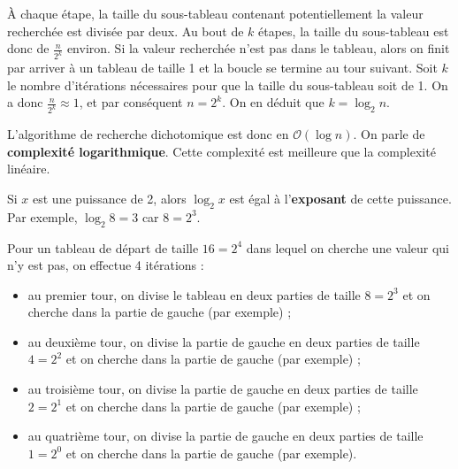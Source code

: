 \documentclass[
  a4paper,
  DIV=11,
  numbers=noendperiod]{scrartcl}
\providecommand{\tightlist}{%
  \setlength{\itemsep}{0pt}\setlength{\parskip}{0pt}}\usepackage{longtable,booktabs,array}
\begin{document}
À chaque étape, la taille du sous-tableau contenant potentiellement la
valeur recherchée est divisée par deux. Au bout de \(k\) étapes, la
taille du sous-tableau est donc de \(\frac{n}{2^k}\) environ. Si la
valeur recherchée n'est pas dans le tableau, alors on finit par arriver
à un tableau de taille 1 et la boucle se termine au tour suivant. Soit
\(k\) le nombre d'itérations nécessaires pour que la taille du
sous-tableau soit de 1. On a donc \(\frac{n}{2^k}\approx 1\), et par
conséquent \(n=2^k\). On en déduit que \(k=\log_2 n\).

L'algorithme de recherche dichotomique est donc en
\(\mathcal{O}(\log n)\). On parle de \textbf{complexité logarithmique}.
Cette complexité est meilleure que la complexité linéaire.

\begin{tcolorbox}[enhanced jigsaw, colframe=quarto-callout-note-color-frame, toprule=.15mm, bottomrule=.15mm, title=\textcolor{quarto-callout-note-color}{\faInfo}\hspace{0.5em}{Notion de logarithme de base 2}, colbacktitle=quarto-callout-note-color!10!white, leftrule=.75mm, left=2mm, opacityback=0, rightrule=.15mm, toptitle=1mm, opacitybacktitle=0.6, breakable, titlerule=0mm, colback=white, coltitle=black, bottomtitle=1mm, arc=.35mm]

Si \(x\) est une puissance de 2, alors \(\log_2 x\) est égal à
l'\textbf{exposant} de cette puissance. Par exemple, \(\log_2 8 = 3\)
car \(8 = 2^3\).

\end{tcolorbox}

Pour un tableau de départ de taille \(16=2^4\) dans lequel on cherche
une valeur qui n'y est pas, on effectue 4 itérations :

\begin{itemize}
\tightlist
\item
  au premier tour, on divise le tableau en deux parties de taille
  \(8=2^3\) et on cherche dans la partie de gauche (par exemple) ;
\item
  au deuxième tour, on divise la partie de gauche en deux parties de
  taille \(4=2^2\) et on cherche dans la partie de gauche (par exemple)
  ;
\item
  au troisième tour, on divise la partie de gauche en deux parties de
  taille \(2=2^1\) et on cherche dans la partie de gauche (par exemple)
  ;
\item
  au quatrième tour, on divise la partie de gauche en deux parties de
  taille \(1=2^0\) et on cherche dans la partie de gauche (par exemple).
\end{itemize}
\end{document}
